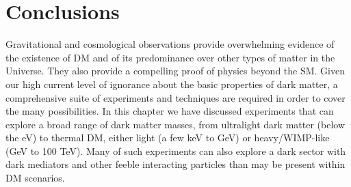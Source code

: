 

















\section{Conclusions}
Gravitational and cosmological observations provide overwhelming evidence of the existence of DM and of its predominance over other types of matter in the Universe. They also provide a compelling  proof of physics beyond the SM. Given our high current level of ignorance about the basic properties of dark matter, a comprehensive suite of  experiments and techniques are required in order to cover the many possibilities.
In this chapter we have discussed experiments that can explore a broad range of dark matter masses, from ultralight dark matter (below the eV) to thermal DM, either light (a few keV to GeV) or heavy/WIMP-like (GeV to 100 TeV).
Many of such experiments can also explore a dark sector with dark mediators and other feeble interacting particles than may be present within DM scenarios.

